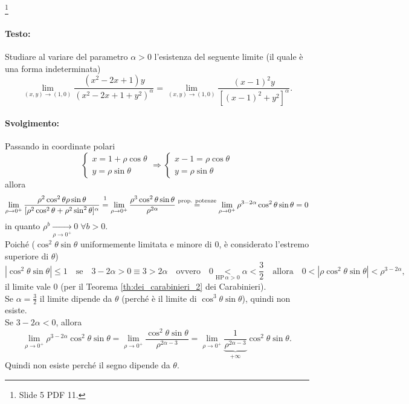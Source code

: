 \begin{example}\footnote{Slide 5 PDF 11.}
    \paragraph{Testo:} Studiare al variare del parametro $\alpha>0$ l'esistenza del seguente limite (il quale è una forma indeterminata)
    \begin{equation*}
        \lim\limits_{(x,y)\rightarrow(1,0)}\frac{(x^2-2x+1)y}{(x^2-2x+1+y^2)^\alpha}=\lim\limits_{(x,y)\rightarrow(1,0)}\frac{(x-1)^2y}{[(x-1)^2+y^2]^\alpha}.
    \end{equation*}
    \paragraph{Svolgimento:} Passando in coordinate polari
    \begin{equation*}
        \begin{cases}
            x=1+\rho\cos\theta\\
            y=\rho\sin\theta
        \end{cases}\Longrightarrow 
        \begin{cases}
            x-1=\rho\cos\theta\\
            y=\rho\sin\theta
        \end{cases}
    \end{equation*}
    allora
    \begin{equation*}
        \lim\limits_{\rho\rightarrow0^+}\frac{\rho^2\cos^2\theta\rho\sin\theta}{[\rho^2\cos^2\theta+\rho^2\sin^2\theta]^\alpha}\overset{\footnotemark}{=}\lim\limits_{\rho\rightarrow 0^+}\frac{\rho^3\cos^2\theta\sin\theta}{\rho^{2\alpha}}\overset{\text{prop. potenze}}{=}\lim\limits_{\rho\rightarrow 0^+}\rho^{3-2\alpha}\cos^2\theta\sin\theta=0
    \end{equation*}
    in quanto $\rho^b\underset{\rho\rightarrow0^+}{\longrightarrow}0\;\forall b>0$.\\
    Poiché ($\cos^2\theta\sin\theta$ uniformemente limitata e minore di 0, è considerato l'estremo superiore di $\theta$)
    \begin{equation*}
        |\cos^2\theta\sin\theta|\leq 1\quad\text{se}\quad 3-2\alpha>0\equiv3>2\alpha\quad\text{ovvero}\quad 0\underset{\text{HP}\, \alpha>0}{<}\alpha<\frac{3}{2}\quad\text{allora}\quad 0<|\rho\cos^2\theta\sin\theta|<\rho^{3-2\alpha},
    \end{equation*}
    il limite vale 0 (per il Teorema \ref{th:dei_carabinieri_2} dei Carabinieri).\\
    Se $\alpha=\frac{3}{2}$ il limite dipende da $\theta$ (perché è il limite di $\cos^3\theta\sin\theta$), quindi non esiste.\\
    Se $3-2\alpha<0$, allora
    \begin{equation*}
        \lim\limits_{\rho\rightarrow0^+}\rho^{3-2\alpha}\cos^2\theta\sin\theta=\lim\limits_{\rho\rightarrow0^+}\frac{\cos^2\theta\sin\theta}{\rho^{2\alpha-3}}=\lim\limits_{\rho\rightarrow0^+}\underbrace{\frac{1}{\rho^{2\alpha-3}}}_{+\infty}\cos^2\theta\sin\theta.
    \end{equation*}
    Quindi non esiste perché il segno dipende da $\theta$.
\end{example}
